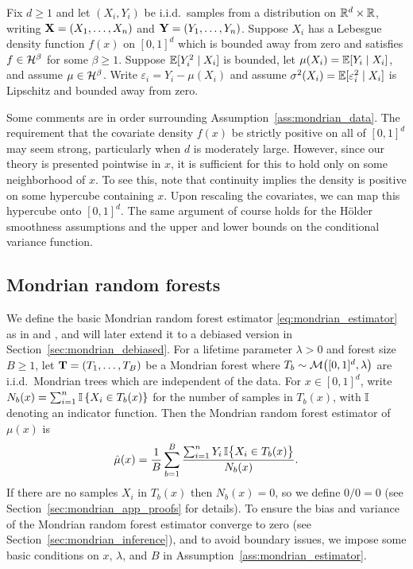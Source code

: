 \begin{assumption}%
  \label{ass:mondrian_data}

  Fix $d \geq 1$ and let $(X_i, Y_i)$ be i.i.d.\ samples from a distribution on
  $\mathbb{R}^d \times \mathbb{R}$, writing $\mathbf{X} = (X_1, \ldots, X_n)$ and
  $\mathbf{Y} = (Y_1, \ldots, Y_n)$. Suppose $X_i$ has a Lebesgue density function
  $f(x)$ on $[0,1]^d$ which is bounded away from zero and satisfies
  $f \in \mathcal{H}^\beta$ for some $\beta \geq 1$. Suppose $\mathbb{E}[Y_i^2 \mid X_i]$ is
  bounded, let $\mu(X_i) = \mathbb{E}[Y_i \mid X_i]$, and assume $\mu \in \mathcal{H}^\beta$.
  Write $\varepsilon_i = Y_i - \mu(X_i)$ and assume
  $\sigma^2(X_i) = \mathbb{E}[\varepsilon_i^2 \mid X_i]$
  is Lipschitz and bounded away from zero.

\end{assumption}

Some comments are in order surrounding Assumption~\ref{ass:mondrian_data}. The
requirement that the covariate density $f(x)$ be strictly positive on all of
$[0,1]^d$ may seem strong, particularly when $d$ is moderately large. However,
since our theory is presented pointwise in $x$, it is sufficient for this to
hold only on some neighborhood of $x$. To see this, note that continuity
implies the density is positive on some hypercube containing $x$. Upon
rescaling the covariates, we can map this hypercube onto $[0,1]^d$. The same
argument of course holds for the H{\"o}lder smoothness assumptions and the
upper and lower bounds on the conditional variance function.

\subsection{Mondrian random forests}
\label{sec:mondrian_forests}

We define the basic Mondrian random forest estimator
\eqref{eq:mondrian_estimator} as in \citet{lakshminarayanan2014mondrian} and
\citet{mourtada2020minimax}, and will later extend it to a debiased version in
Section~\ref{sec:mondrian_debiased}. For a lifetime parameter $\lambda > 0$ and
forest
size $B \geq 1$, let $\mathbf{T} = (T_1, \ldots, T_B)$ be a Mondrian forest where
$T_b \sim \mathcal{M}\big([0,1]^d, \lambda\big)$ are i.i.d.\ Mondrian trees
which are independent of the data. For $x \in [0,1]^d$, write
$N_b(x) = \sum_{i=1}^{n} \mathbb{I} \left\{ X_i \in T_b(x) \right\}$ for the number of
samples in $T_b(x)$, with $\mathbb{I}$ denoting an indicator function. Then the
Mondrian random forest estimator of $\mu(x)$ is
%
\begin{align}
  \label{eq:mondrian_estimator}
  \hat\mu(x) = \frac{1}{B} \sum_{b=1}^B
  \frac{\sum_{i=1}^n Y_i \, \mathbb{I}\big\{ X_i \in T_b(x) \big\}} {N_b(x)}.
\end{align}
%
If there are no samples $X_i$ in $T_b(x)$ then $N_b(x) = 0$, so we define
$0/0 = 0$ (see Section~\ref{sec:mondrian_app_proofs} for details). To ensure the
bias and variance of the Mondrian random forest estimator converge to zero (see
Section~\ref{sec:mondrian_inference}), and to avoid boundary issues, we impose
some basic conditions on $x$, $\lambda$, and $B$ in
Assumption~\ref{ass:mondrian_estimator}.

